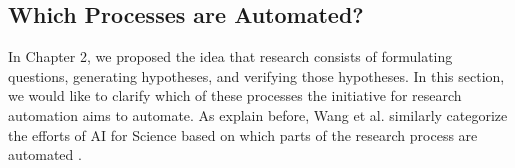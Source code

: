 \documentclass{article}
\begin{document}

\subsection{Which Processes are Automated?}
In Chapter 2, we proposed the idea that research consists of formulating questions, generating hypotheses, and verifying those hypotheses. In this section, we would like to clarify which of these processes the initiative for research automation aims to automate. As explain before, Wang et al. similarly categorize the efforts of AI for Science based on which parts of the research process are automated \cite{wang2023scientific}. 
\end{document}
